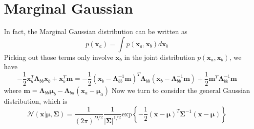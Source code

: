 \documentclass{article}
\begin{document}
   \section{Marginal Gaussian}
   In fact, the Marginal Gaussian distribution can be written as
   \begin{equation}
   p\left(\mathbf{x}_a\right) = \int p\left(\mathbf{x}_a,\mathbf{x}_{b}\right)d\mathbf{x}_b\label{eq:joint12}
   \end{equation}
   Picking out those terms only involve $\mathbf{x}_b$ in the joint distribution $p\left(\mathbf{x}_a,\mathbf{x}_b\right)$, we have
   \begin{equation}
   -\frac{1}{2}\mathbf{x}_b^T\boldsymbol{\Lambda}_{bb}\mathbf{x}_b+\mathbf{x}_b^T\mathbf{m}=-\frac{1}{2}\left(\mathbf{x}_b-\boldsymbol{\Lambda}_{bb}^{-1}\mathbf{m}\right)^T\boldsymbol{\Lambda}_{bb}\left(\mathbf{x}_b-\boldsymbol{\Lambda}_{bb}^{-1}\mathbf{m}\right)+\frac{1}{2}\mathbf{m}^T\boldsymbol{\Lambda}_{bb}^{-1}\mathbf{m}\label{eq:joint13}
   \end{equation}
   where $\mathbf{m} = \boldsymbol{\Lambda}_{bb}\boldsymbol{\mu}_b - \boldsymbol{\Lambda}_{ba}\left(\mathbf{x}_a - \boldsymbol{\mu}_a\right)$ 
   Now we turn to consider the general Gaussian distribution, which is 
   \begin{equation}
   \mathcal{N}\left(\mathbf{x}|\boldsymbol{\mu},\boldsymbol{\Sigma}\right) = 
   \frac{1}{\left(2\pi\right)^{D/2}}\frac{1}{\left|\boldsymbol{\Sigma}\right|^{1/2}}\text{exp}\left\{-\frac{1}{2}\left(\mathbf{x}-\boldsymbol{\mu}\right)^T\boldsymbol{\Sigma}^{-1}\left(\mathbf{x}-\boldsymbol{\mu}\right)\right\} \label{eq:joint14}
   \end{equation}
\end{document}
